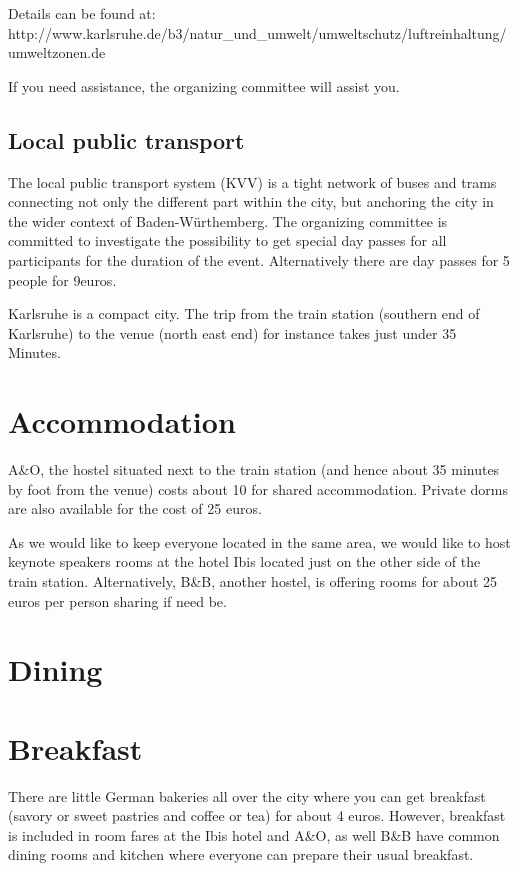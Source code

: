 Details can be found at:
http://www.karlsruhe.de/b3/natur_und_umwelt/umweltschutz/luftreinhaltung/umweltzonen.de

If you need assistance, the organizing committee will assist you.

\subsection{Local public transport}



The local public transport system (KVV) is a tight network of buses and trams connecting not only the different part within the city, but anchoring the city in the wider context of Baden-Würthemberg. The organizing committee is committed to investigate the possibility to get special day passes for all participants for the duration of the event. Alternatively there are day passes for 5 people for 9euros.

Karlsruhe is a compact city. The trip from the train station (southern end of Karlsruhe) to the venue (north east end) for instance takes just under 35 Minutes.

\section{Accommodation}

A&O, the hostel situated next to the train station (and hence about 35 minutes by foot from the venue) costs about 10 for shared accommodation. Private dorms are also available for the cost of 25 euros. 

As we would like to keep everyone located in the same area, we would like to host keynote speakers rooms at the hotel Ibis located just on the other side of the train station. 
Alternatively, B&B, another hostel, is offering rooms for about 25 euros per person sharing if need be. 


\section{Dining}

\section{Breakfast}
There are little German bakeries all over the city where you can get breakfast (savory or sweet pastries and coffee or tea) for about 4 euros. However, breakfast is included in room fares at the Ibis hotel and A&O, as well B&B have common dining rooms and kitchen where everyone can prepare their usual breakfast.
 
